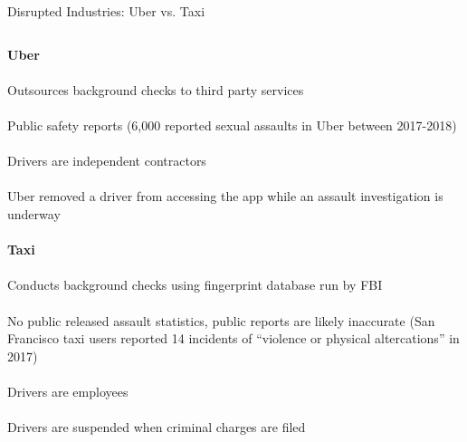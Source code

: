\documentclass[nobackground,dvipsnames,table,aspectratio=169]{beamer}
\begin{document}
\begin{frame}{Disrupted Industries: Uber vs. Taxi}
    \begin{columns}
            \centering
            \textbf{Uber}\\~\\
            Outsources background checks to third party services\\~\\
            Public safety reports (6,000 reported sexual assaults in Uber between 2017-2018)\\~\\
            Drivers are independent contractors\\~\\
            Uber removed a driver from accessing the app while an assault investigation is underway\\~\\
            \centering
            \textbf{Taxi}\\~\\
            Conducts background checks using fingerprint database run by FBI\\~\\
            No public released assault statistics, public reports are likely inaccurate (San Francisco taxi users reported 14 incidents of “violence or physical altercations” in 2017)\\~\\
            Drivers are employees\\~\\
            Drivers are suspended when criminal charges are filed\\~\\
    \end{columns}
\end{frame}
\end{document}
